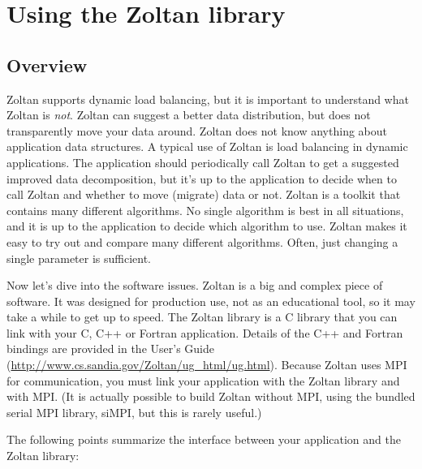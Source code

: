 %
% 
\chapter{Using the Zoltan library}
\label{cha:using}


\section{Overview}

Zoltan supports dynamic load balancing, but it is important 
to understand what Zoltan is \emph{not}. Zoltan can suggest
a better data distribution, but does not transparently move
your data around. Zoltan does not know anything about application
data structures. A typical use of Zoltan is 
load balancing in dynamic applications. The application
should periodically call Zoltan to get a suggested improved
data decomposition, but it's up to the application to
decide when to call Zoltan and whether to move (migrate) data or not.
Zoltan is a toolkit that contains many different algorithms.
No single algorithm is best in all situations, and it is
up to the application to decide which algorithm to use.
Zoltan makes it easy to try out and compare many different
algorithms. Often, just changing a single parameter is sufficient.

Now let's dive into the software issues. Zoltan is a big and complex 
piece of software. It was designed for production use, not as an educational 
tool, so it may take a while to get up to speed.
The Zoltan library is a C library that you can link with your C,
C++ or Fortran application.  Details of the C++ and Fortran bindings
are provided in the User's Guide 
(\url{http://www.cs.sandia.gov/Zoltan/ug_html/ug.html}).
Because Zoltan uses MPI for communication, you must link your application
with the Zoltan library and with MPI. (It is actually possible to build
Zoltan without MPI, using the bundled serial MPI library, siMPI,
but this is rarely useful.)

The following points summarize the interface between your
application and the Zoltan library:

